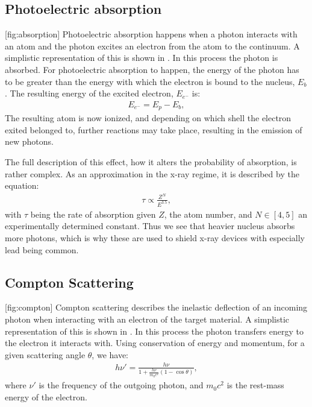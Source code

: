 \subsection{Photoelectric absorption}
[fig:absorption]
{}
Photoelectric absorption happens when a photon interacts with an atom and the photon excites an electron from the atom to the continuum. A simplistic representation of this is shown in . In this process the photon is absorbed. For photoelectric absorption to happen, the energy of the photon has to be greater than the energy with which the electron is bound to the nucleus, $E_b$. The resulting energy of the excited electron, $E_{e^-}$ is:
\begin{align}
E_{e^-} = E_p - E_b,
\end{align}
The resulting atom is now ionized, and depending on which shell the electron exited belonged to, further reactions may take place, resulting in the emission of new photons.

The full description of this effect, how it alters the probability of absorption, is rather complex. As an approximation in the x-ray regime, it is described by the equation:
\begin{align}
\tau \propto \frac{Z^N}{E^{3.5}},
\end{align}
with $\tau$ being the rate of absorption given $Z$, the atom number, and $N \in [4,5]$ an experimentally determined constant. Thus we see that heavier nucleus absorbs more photons, which is why these are used to shield x-ray devices with especially lead being common.

\subsection{Compton Scattering}
[fig:compton]
{}
Compton scattering describes the inelastic deflection of an incoming photon when interacting with an electron of the target material. A simplistic representation of this is shown in . In this process the photon transfers energy to the electron it interacts with. Using conservation of energy and momentum, for a given scattering angle $\theta$, we have:
\begin{align}
h \nu' = \frac{h \nu}{1+\frac{h \nu}{m_0c^2}(1-\cos\theta)},
\end{align}
where $\nu'$ is the frequency of the outgoing photon, and $m_0c^2$ is the rest-mass energy of the electron.
